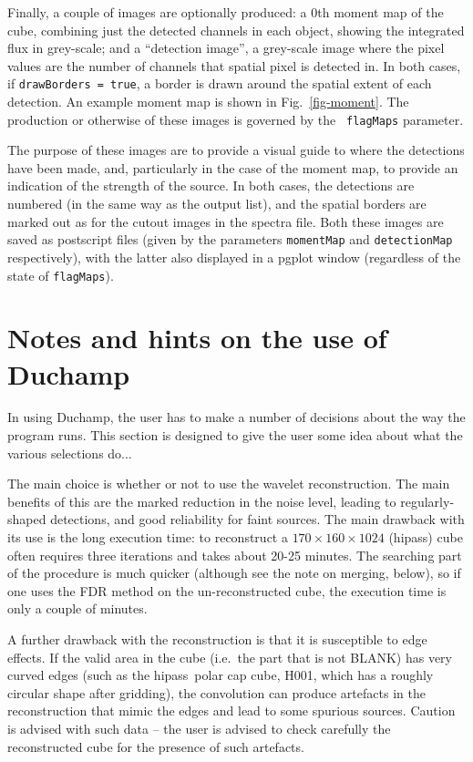 \documentclass[12pt,a4paper]{article}
\newcommand{\ie}{i.e.\ }
\newcommand{\hipass}{{\sc hipass}}
\begin{document}
Finally, a couple of images are optionally produced: a 0th moment map
of the cube, combining just the detected channels in each object,
showing the integrated flux in grey-scale; and a ``detection image'',
a grey-scale image where the pixel values are the number of channels
that spatial pixel is detected in. In both cases, if {\tt drawBorders =
true}, a border is drawn around the spatial extent of each
detection. An example moment map is shown in Fig.~\ref{fig-moment}.
The production or otherwise of these images is governed by the {\tt
flagMaps} parameter.

The purpose of these images are to provide a visual guide to where the
detections have been made, and, particularly in the case of the moment
map, to provide an indication of the strength of the source. In both
cases, the detections are numbered (in the same way as the output
list), and the spatial borders are marked out as for the cutout images
in the spectra file. Both these images are saved as postscript files
(given by the parameters {\tt momentMap} and {\tt detectionMap}
respectively), with the latter also displayed in a {\sc pgplot}
window (regardless of the state of {\tt flagMaps}).

\section{Notes and hints on the use of Duchamp}

In using Duchamp, the user has to make a number of decisions about
the way the program runs. This section is designed to give the user
some idea about what the various selections do...

The main choice is whether or not to use the wavelet
reconstruction. The main benefits of this are the marked reduction in
the noise level, leading to regularly-shaped detections, and good
reliability for faint sources. The main drawback with its use is the
long execution time: to reconstruct a $170\times160\times1024$
(\hipass) cube often requires three iterations and takes about 20-25
minutes. The searching part of the procedure is much quicker (although
see the note on merging, below), so if one uses the FDR method on the
un-reconstructed cube, the execution time is only a couple of minutes.

A further drawback with the reconstruction is that it is susceptible
to edge effects. If the valid area in the cube (\ie the part that is
not BLANK) has very curved edges (such as the \hipass\ polar cap cube,
H001, which has a roughly circular shape after gridding), the
convolution can produce artefacts in the reconstruction that mimic
the edges and lead to some spurious sources. Caution is advised with
such data -- the user is advised to check carefully the reconstructed
cube for the presence of such artefacts.
\end{document}
